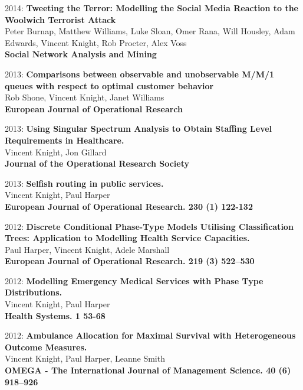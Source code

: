 \documentclass[10pt]{res} %
\begin{document}
\begin{resume}
\begin{etaremune}
\item
2014: \textbf{Tweeting the Terror: Modelling the Social Media Reaction to the Woolwich Terrorist Attack}\\
Peter Burnap, Matthew Williams, Luke Sloan, Omer Rana, Will Housley, Adam Edwards, Vincent Knight, Rob Procter, Alex Voss
\\
\textbf{Social Network Analysis and Mining}
\\

\item
2013: \textbf{Comparisons between observable and unobservable M/M/1 queues with respect to optimal customer behavior}\\
Rob Shone, Vincent Knight, Janet Williams
\\
\textbf{European Journal of Operational Research}
\\

\item
2013: \textbf{Using Singular Spectrum Analysis to Obtain Staffing Level Requirements in Healthcare.}\\
Vincent Knight, Jon Gillard
\\
\textbf{Journal of the Operational Research Society}
\\

\item
2013: \textbf{Selfish routing in public services.}\\
Vincent Knight, Paul Harper
\\
\textbf{European Journal of Operational Research. 230 (1) 122-132}
\\

\item
2012: \textbf{Discrete Conditional Phase-Type Models Utilising Classification Trees: Application to Modelling Health Service Capacities.}\\
Paul Harper, Vincent Knight, Adele Marshall
\\
\textbf{European Journal of Operational Research. 219 (3) 522--530}
\\

\item
2012: \textbf{Modelling Emergency Medical Services with Phase Type Distributions.}\\
Vincent Knight, Paul Harper
\\
\textbf{Health Systems. 1 53-68}
\\

\item
2012: \textbf{Ambulance Allocation for Maximal Survival with Heterogeneous Outcome Measures.}\\
Vincent Knight, Paul Harper, Leanne Smith
\\
\textbf{OMEGA - The International Journal of Management Science. 40 (6) 918--926}
\\


\end{etaremune}
\end{resume}
\end{document}
